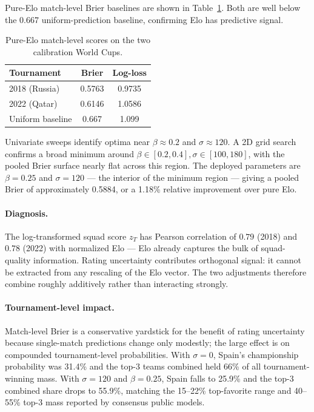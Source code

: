 \documentclass[11pt]{article}
\begin{document}
Pure-Elo match-level Brier baselines are shown in Table~\ref{tab:brier_baseline}. Both are well below the 0.667 uniform-prediction baseline, confirming Elo has predictive signal.

\begin{table}[h]
\centering
\begin{tabular}{@{}lcc@{}}
\toprule
Tournament & Brier & Log-loss \\
\midrule
2018 (Russia) & 0.5763 & 0.9735 \\
2022 (Qatar)  & 0.6146 & 1.0586 \\
\midrule
Uniform baseline & 0.667 & 1.099 \\
\bottomrule
\end{tabular}
\caption{Pure-Elo match-level scores on the two calibration World Cups.}
\label{tab:brier_baseline}
\end{table}

Univariate sweeps identify optima near $\beta \approx 0.2$ and $\sigma \approx 120$. A 2D grid search confirms a broad minimum around $\beta \in [0.2, 0.4], \sigma \in [100, 180]$, with the pooled Brier surface nearly flat across this region. The deployed parameters are $\beta = 0.25$ and $\sigma = 120$ --- the interior of the minimum region --- giving a pooled Brier of approximately 0.5884, or a 1.18\% relative improvement over pure Elo.

\paragraph{Diagnosis.} The log-transformed squad score $z_T$ has Pearson correlation of $0.79$ (2018) and $0.78$ (2022) with normalized Elo --- Elo already captures the bulk of squad-quality information. Rating uncertainty contributes orthogonal signal: it cannot be extracted from any rescaling of the Elo vector. The two adjustments therefore combine roughly additively rather than interacting strongly.

\paragraph{Tournament-level impact.} Match-level Brier is a conservative yardstick for the benefit of rating uncertainty because single-match predictions change only modestly; the large effect is on compounded tournament-level probabilities. With $\sigma = 0$, Spain's championship probability was 31.4\% and the top-3 teams combined held 66\% of all tournament-winning mass. With $\sigma = 120$ and $\beta = 0.25$, Spain falls to 25.9\% and the top-3 combined share drops to 55.9\%, matching the 15--22\% top-favorite range and 40--55\% top-3 mass reported by consensus public models.
\end{document}

